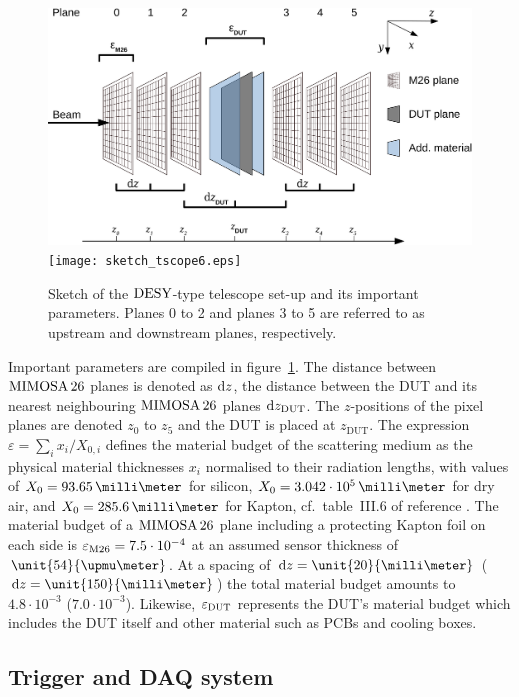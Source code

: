 \begin{figure}[tb]
	\center
	\ifdefined\notFOREPJ
	\includegraphics[width=.9\textwidth]{figures/sketch_tscope6.eps}
	\else
	\texttt{[image: sketch\_tscope6.eps]}
	\fi
	\caption[Sketch of the $\DESY$-type telescope set-up]{Sketch of the $\DESY$-type telescope set-up and its important parameters.
	Planes 0 to 2 and planes 3 to 5 are referred to as upstream and downstream planes, respectively.}
	\label{fig:datura_sketch}
\end{figure}

Important parameters are compiled in figure~\ref{fig:datura_sketch}. 
The distance between $\textrm{MIMOSA\,26}$ planes is denoted as $\textrm{d}z$, the distance between the DUT and its nearest neighbouring $\textrm{MIMOSA\,26}$ planes $\textrm{d}z_{\textrm{DUT}}$. 
The $z$-positions of the pixel planes are denoted $z_0$ to $z_5$ and the DUT is placed at $z_{\textrm{DUT}}$. 
The expression $\varepsilon = \sum_i x_{i}/X_{0,i}$ defines the material budget of the scattering medium as the physical material thicknesses $x_i$ normalised to their radiation lengths,
 with values of $X_0 = 93.65\,\milli\meter$ for silicon, $X_0 = 3.042\cdot 10^{5}\,\milli\meter$ for dry air, and $X_0 = 285.6\,\milli\meter$ for Kapton, cf.~table~III.6 of reference \cite{ref:x0values}.
The material budget of a $\textrm{MIMOSA\,26}$ plane including a protecting Kapton foil on each side is $\mathnormal{\varepsilon_{\textrm{M26}}} = 7.5\cdot10^{-4}$ at an assumed sensor thickness of $\unit{54}{\upmu\meter}$. 
At a spacing of $\dz = \unit{20}{\milli\meter}$ ($\dz = \unit{150}{\milli\meter}$) the total material budget amounts to $4.8\cdot10^{-3}$ ($7.0\cdot10^{-3}$).
Likewise, $\mathnormal{\varepsilon_{\textrm{DUT}}}$ represents the DUT's material budget which includes the DUT itself and other material such as PCBs and cooling boxes.

\subsection{Trigger and DAQ system}
\label{sec:tdaq}


